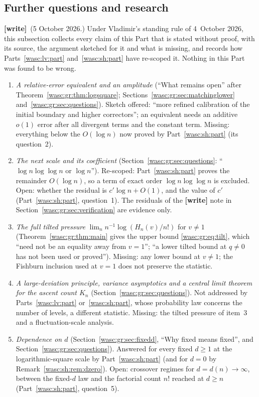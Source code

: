 \documentclass[11pt,a4paper]{article}
\theoremstyle{remark}\newtheorem{remark}[theorem]{Remark}
\numberwithin{equation}{section}
\newcommand{\wtag}{\textup{\textbf{[write]}}}
\begin{document}
\subsection{Further questions and research}\label{wasc:gr:sub:further}
\wtag\ (5 October 2026.) Under Vladimir's standing rule of 4~October 2026, this subsection collects every claim of this Part that is stated without proof, with its source, the argument sketched for it and what is missing, and records how Parts~\ref{wasc:lv:part} and~\ref{wasc:sh:part} have re-scoped it. Nothing in this Part was found to be wrong.
\begin{enumerate}[leftmargin=*,itemsep=3pt]
\item \emph{A relative-error equivalent and an amplitude} (``What remains open'' after Theorem~\ref{wasc:gr:thm:logsquare}; Sections~\ref{wasc:gr:sec:matchinglower} and~\ref{wasc:gr:sec:questions}). Sketch offered: ``more refined calibration of the initial boundary and higher correctors''; an equivalent needs an additive $o(1)$ error after all divergent terms and the constant term. Missing: everything below the $O(\log n)$ now proved by Part~\ref{wasc:sh:part} (its question~2).
\item \emph{The next scale and its coefficient} (Section~\ref{wasc:gr:sec:questions}: ``$\log n\log\log n$ or $\log n$''). Re-scoped: Part~\ref{wasc:sh:part} proves the remainder $O(\log n)$, so a term of exact order $\log n\log\log n$ is excluded. Open: whether the residual is $c'\log n+O(1)$, and the value of $c'$ (Part~\ref{wasc:sh:part}, question~1). The residuals of the \textbf{[write]} note in Section~\ref{wasc:gr:sec:verification} are evidence only.
\item \emph{The full tilted pressure} $\lim_n n^{-1}\log(H_n(v)/n!)$ for $v\ne1$ (Theorem~\ref{wasc:gr:thm:main} gives the upper bound \eqref{wasc:gr:eq:tilt}, which ``need not be an equality away from $v=1$''; ``a lower tilted bound at $q\ne0$ has not been used or proved''). Missing: any lower bound at $v\ne1$; the Fishburn inclusion used at $v=1$ does not preserve the statistic.
\item \emph{A large-deviation principle, variance asymptotics and a central limit theorem for the ascent count $K_n$} (Section~\ref{wasc:gr:sec:questions}). Not addressed by Parts~\ref{wasc:lv:part} or~\ref{wasc:sh:part}, whose probability law concerns the number of levels, a different statistic. Missing: the tilted pressure of item~3 and a fluctuation-scale analysis.
\item \emph{Dependence on $d$} (Section~\ref{wasc:gr:sec:fixedd}, ``Why fixed means fixed'', and Section~\ref{wasc:gr:sec:questions}). Answered for every fixed $d\ge1$ at the logarithmic-square scale by Part~\ref{wasc:sh:part} (and for $d=0$ by Remark~\ref{wasc:sh:rem:dzero}). Open: crossover regimes for $d=d(n)\to\infty$, between the fixed-$d$ law and the factorial count $n!$ reached at $d\ge n$ (Part~\ref{wasc:sh:part}, question~5).

\end{enumerate}
\end{document}
